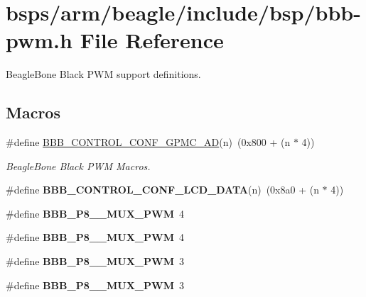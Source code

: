 \hypertarget{bbb-pwm_8h}{}\section{bsps/arm/beagle/include/bsp/bbb-\/pwm.h File Reference}
\label{bbb-pwm_8h}


Beagle\+Bone Black P\+WM support definitions.  


\subsection*{Macros}
\begin{DoxyCompactItemize}
\item 
\#define \mbox{\hyperlink{bbb-pwm_8h_afa9b9985b06cd431f60e5e4d16e61d93}{B\+B\+B\+\_\+\+C\+O\+N\+T\+R\+O\+L\+\_\+\+C\+O\+N\+F\+\_\+\+G\+P\+M\+C\+\_\+\+AD}}(n)~(0x800 + (n $\ast$ 4))
\begin{DoxyCompactList}\small\item\em Beagle\+Bone Black P\+WM Macros. \end{DoxyCompactList}\item 
\mbox{\label{bbb-pwm_8h_a9ccf23ecbf38750c86ab45cefc745a42}} 
\#define {\bfseries B\+B\+B\+\_\+\+C\+O\+N\+T\+R\+O\+L\+\_\+\+C\+O\+N\+F\+\_\+\+L\+C\+D\+\_\+\+D\+A\+TA}(n)~(0x8a0 + (n $\ast$ 4))
\item 
\mbox{\label{bbb-pwm_8h_a422eeee4d9e2d521a6ddf00256966f1e}} 
\#define {\bfseries B\+B\+B\+\_\+\+P8\+\_\+\_\+\+M\+U\+X\+\_\+\+P\+WM}~4
\item 
\mbox{\label{bbb-pwm_8h_ac128cd130bc23031b4c1bbeee1b975d6}} 
\#define {\bfseries B\+B\+B\+\_\+\+P8\+\_\+\_\+\+M\+U\+X\+\_\+\+P\+WM}~4
\item 
\mbox{\label{bbb-pwm_8h_a18f847de4bba6f07c31bc126571ddc5e}} 
\#define {\bfseries B\+B\+B\+\_\+\+P8\+\_\+\_\+\+M\+U\+X\+\_\+\+P\+WM}~3
\item 
\mbox{\label{bbb-pwm_8h_a47c783ab7f0507fdc421541077c24167}} 
\#define {\bfseries B\+B\+B\+\_\+\+P8\+\_\+\_\+\+M\+U\+X\+\_\+\+P\+WM}~3
\item 
\mbox{\label{bbb-pwm_8h_aeaaf4b7e7067dc806cff01ea3974ab4d}} 

\end{DoxyCompactItemize}
